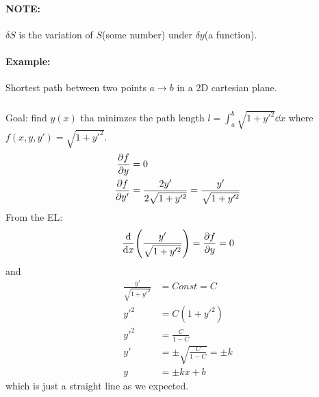 \documentclass[../main.tex]{subfiles}
\begin{document}
\paragraph*{NOTE:} $\delta S$ is the variation of $S$(some number) under $\delta y$(a function).

\paragraph*{Example:} Shortest path between two points $a \to b$ in a 2D cartesian plane.

\subparagraph*{} Goal: find $y(x)$ tha minimzes the path length $l = \int_a^b \sqrt{1 + y'^2} \dd x$
where $f(x, y, y') = \sqrt{1 + y'^2}$.
\begin{align*}
    \pdv{f}{y} &= 0 \\
    \pdv{f}{y'} &= \frac{2y'}{2\sqrt{1 + y'^2}} = \frac{y'}{\sqrt{1 + y'^2}} \\
\end{align*}
From the EL:
\begin{align*}
    \dv{x}(\frac{y'}{\sqrt{1 + y'^2}}) = \pdv{f}{y} =  0 \\
\end{align*}
and
\begin{align*}
    \frac{y'}{\sqrt{1 + y'^2}} &= Const = C \\
    y'^2 &= C (1 + y'^2) \\
    y'^2 &= \frac{C}{1 - C} \\
    y' &= \pm \sqrt{\frac{C}{1 - C}} = \pm k \\
    y &= \pm kx + b
\end{align*}
which is just a straight line as we expected. 
\end{document}
